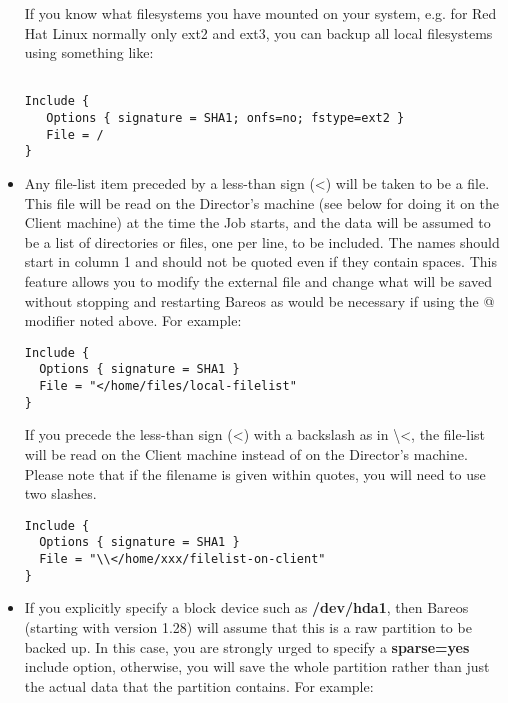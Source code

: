 \begin{itemize}
   If you know what filesystems you have mounted on your system, e.g.
   for Red Hat Linux normally only ext2 and ext3, you can backup
   all local filesystems using something like:

\footnotesize
\begin{verbatim}

Include {
   Options { signature = SHA1; onfs=no; fstype=ext2 }
   File = /
}
\end{verbatim}
\normalsize


\item Any file-list item preceded by a less-than sign ({\textless})  will be taken
   to be a file. This file will be read on the Director's machine (see
   below for doing it on the Client machine) at the time
   the Job starts, and the  data will be assumed to be a list of directories or
   files,  one per line, to be included. The names should start in  column 1 and
   should not be quoted even if they contain  spaces. This feature allows you to
   modify the external  file and change what will be saved without stopping and
   restarting Bareos as would be necessary if using the @  modifier noted above.
   For example:

\footnotesize
\begin{verbatim}
Include {
  Options { signature = SHA1 }
  File = "</home/files/local-filelist"
}
\end{verbatim}
\normalsize

   If you precede the less-than sign ({\textless}) with a backslash as in
   \textbackslash{}{\textless}, the file-list will be read on the Client machine
   instead of on the Director's machine.  Please note that if the filename
   is given within quotes, you will need to use two slashes.

\footnotesize
\begin{verbatim}
Include {
  Options { signature = SHA1 }
  File = "\\</home/xxx/filelist-on-client"
}
\end{verbatim}
\normalsize

\item If you explicitly specify a block device such as {\bf /dev/hda1},  then
   Bareos (starting with version 1.28) will assume that this  is a raw partition
   to be backed up. In this case, you are strongly  urged to specify a {\bf
   sparse=yes} include option, otherwise, you  will save the whole partition
   rather than just the actual data that  the partition contains. For example:


\end{itemize}
